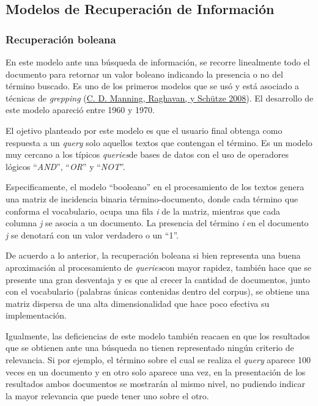 \documentclass[
  12pt,
  openany]{book}
\begin{document}
\hypertarget{MRI}{%
\subsection{Modelos de Recuperación de Información}\label{MRI}}

\hypertarget{MRIbol}{%
\subsubsection{Recuperación boleana}\label{MRIbol}}

En este modelo ante una búsqueda de información, se recorre linealmente todo el documento para retornar un valor boleano indicando la presencia o no del término buscado. Es uno de los primeros modelos que se usó y está asociado a técnicas de \emph{grepping} (\protect\hyperlink{ref-manning2008}{C. D. Manning, Raghavan, y Schütze 2008}). El desarrollo de este modelo apareció entre 1960 y 1970.

El ojetivo planteado por este modelo es que el usuario final obtenga como respuesta a un \emph{query} solo aquellos textos que contengan el término. Es un modelo muy cercano a los típicos \emph{queries}de bases de datos con el uso de operadores lógicos ``\emph{AND}'', ``\emph{OR}'' y ``\emph{NOT}''.

Especificamente, el modelo ``booleano'' en el procesamiento de los textos genera una matriz de incidencia binaria término-documento, donde cada término que conforma el vocabulario, ocupa una fila \emph{i} de la matriz, mientras que cada columna \emph{j} se asocia a un documento. La presencia del término \emph{i} en el documento \emph{j} se denotará con un valor verdadero o un ``1''.

De acuerdo a lo anterior, la recuperación boleana si bien representa una buena aproximación al procesamiento de \emph{queries}con mayor rapidez, también hace que se presente una gran desventaja y es que al crecer la cantidad de documentos, junto con el vocabulario (palabras únicas contenidas dentro del corpus), se obtiene una matriz dispersa de una alta dimensionalidad que hace poco efectiva su implementación.

Igualmente, las deficiencias de este modelo también reacaen en que los resultados que se obtienen ante una búsqueda no tienen representado ningún criterio de relevancia. Si por ejemplo, el término sobre el cual se realiza el \emph{query} aparece 100 veces en un documento y en otro solo aparece una vez, en la presentación de los resultados ambos documentos se mostrarán al mismo nivel, no pudiendo indicar la mayor relevancia que puede tener uno sobre el otro.
\end{document}
